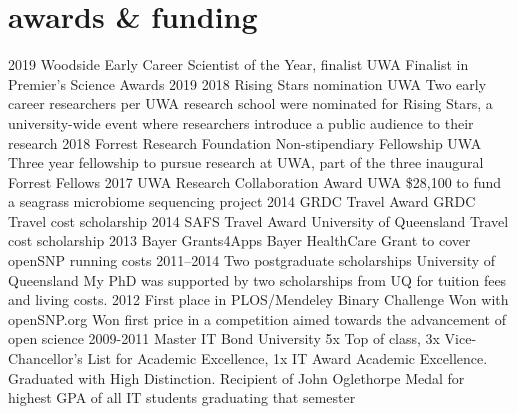 \documentclass[]{friggeri-cv} %
\begin{document}
\newpage

\section{awards \& funding}

\begin{entrylist}
\entry
{2019}
{Woodside Early Career Scientist of the Year, finalist}
{UWA}
{Finalist in Premier's Science Awards 2019}
\entry
{2018}
{Rising Stars nomination}
{UWA}
{Two early career researchers per UWA research school were nominated for Rising Stars, a university-wide event where researchers introduce a public audience to their research}
\entry
{2018}
{Forrest Research Foundation Non-stipendiary Fellowship}
{UWA}
{Three year fellowship to pursue research at UWA, part of the three inaugural Forrest Fellows}
\entry
{2017}
{UWA Research Collaboration Award}
{UWA}
{\$28,100 to fund a seagrass microbiome sequencing project}
\entry
{2014}
{GRDC Travel Award}
{GRDC}
{Travel cost scholarship}
\entry
{2014}
{SAFS Travel Award}
{University of Queensland}
{Travel cost scholarship}
\entry
{2013}
{Bayer Grants4Apps}
{Bayer HealthCare}
{Grant to cover openSNP running costs}
\entry
{2011--2014}
{Two postgraduate scholarships}
{University of Queensland}
{My PhD was supported by two scholarships from UQ for tuition fees and living costs.}
\entry
{2012}
{First place in PLOS/Mendeley Binary Challenge}
{Won with openSNP.org}
{Won first price in a competition aimed towards the advancement of open science}
\entry
{2009-2011}
{Master IT}
{Bond University}
{5x Top of class,  3x Vice-Chancellor's List for Academic Excellence, 1x IT Award Academic Excellence. Graduated with High Distinction. Recipient of John Oglethorpe Medal for highest GPA of all IT students graduating that semester}
\end{entrylist}
\end{document}
